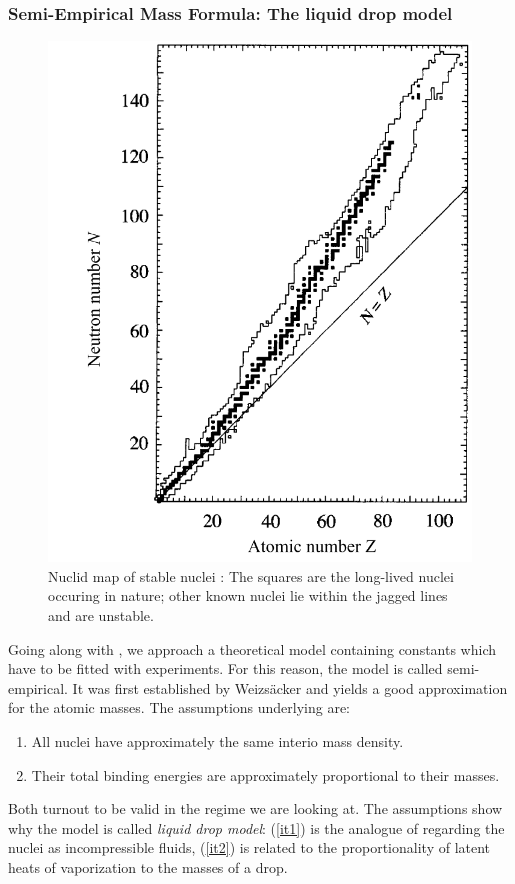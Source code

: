 \subsubsection{Semi-Empirical Mass Formula: The liquid drop model}
\begin{figure}[htpb]
    \centering
    \includegraphics[width=0.6\linewidth]{figures/nuclidmap}
    \caption{Nuclid map of stable nuclei \cite{Hooshyar}: The squares are the long-lived nuclei
    occuring in nature; other known nuclei lie within the jagged lines and are unstable.}
    \label{fig:nuclidmap}
\end{figure}
\label{ssub:Semi-Empirical Mass Formula: The Liquid Drop Model}
Going along with  \cite{Hooshyar}, we approach a theoretical model containing constants which
have to be fitted with experiments. For this reason, the model is called semi-empirical. 
It was first established by Weizsäcker and yields a 
good approximation for the atomic masses. The assumptions underlying are:
\begin{enumerate}
    \item All nuclei have approximately the same interio mass density.
        \label{it1}
    \item Their total binding energies are approximately proportional to their masses.
        \label{it2}
\end{enumerate}
Both turnout to be valid in the regime we are looking at.
The assumptions show why the model is called \emph{liquid drop model}: 
(\ref{it1}) is the analogue of regarding the nuclei as incompressible fluids, 
(\ref{it2}) is related to the proportionality of latent heats of vaporization to the masses of a drop. 
